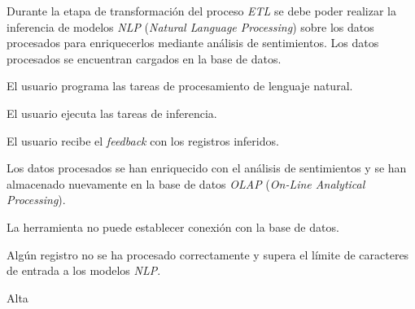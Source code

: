 {Durante la etapa de transformación del proceso \textit{ETL} se debe poder realizar la inferencia de modelos \textit{NLP} (\textit{Natural Language Processing}) sobre los datos procesados para enriquecerlos mediante análisis de sentimientos.}
{Los datos procesados se encuentran cargados en la base de datos.}
{
\item El usuario programa las tareas de procesamiento de lenguaje natural.
\item El usuario ejecuta las tareas de inferencia.
\item El usuario recibe el \textit{feedback} con los registros inferidos.
}
{Los datos procesados se han enriquecido con el análisis de sentimientos y se han almacenado nuevamente en la base de datos \textit{OLAP} (\textit{On-Line Analytical Processing}).}
{
\item La herramienta no puede establecer conexión con la base de datos.
\item Algún registro no se ha procesado correctamente y supera el límite de caracteres de entrada a los modelos \textit{NLP}.
}
{Alta}

